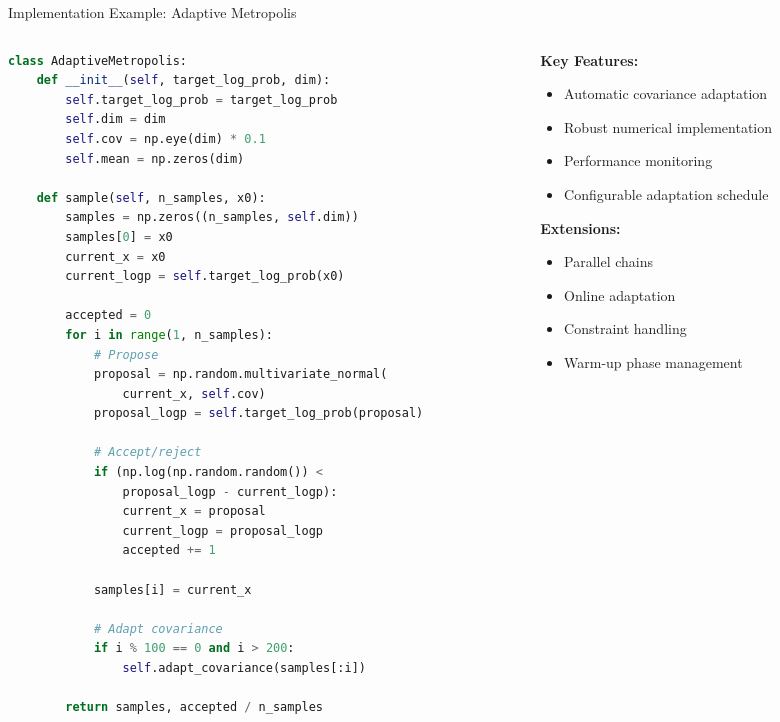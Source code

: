 \documentclass[aspectratio=169,11pt]{beamer}
\begin{document}
\begin{frame}[fragile]{Implementation Example: Adaptive Metropolis}
\begin{columns}
\begin{column}{0.55\textwidth}
\begin{lstlisting}[language=Python, basicstyle=\tiny]
class AdaptiveMetropolis:
    def __init__(self, target_log_prob, dim):
        self.target_log_prob = target_log_prob
        self.dim = dim
        self.cov = np.eye(dim) * 0.1
        self.mean = np.zeros(dim)
        
    def sample(self, n_samples, x0):
        samples = np.zeros((n_samples, self.dim))
        samples[0] = x0
        current_x = x0
        current_logp = self.target_log_prob(x0)
        
        accepted = 0
        for i in range(1, n_samples):
            # Propose
            proposal = np.random.multivariate_normal(
                current_x, self.cov)
            proposal_logp = self.target_log_prob(proposal)
            
            # Accept/reject
            if (np.log(np.random.random()) < 
                proposal_logp - current_logp):
                current_x = proposal
                current_logp = proposal_logp
                accepted += 1
                
            samples[i] = current_x
            
            # Adapt covariance
            if i % 100 == 0 and i > 200:
                self.adapt_covariance(samples[:i])
                
        return samples, accepted / n_samples
\end{lstlisting}
\end{column}
\begin{column}{0.45\textwidth}
\textbf{Key Features:}
\begin{itemize}
\item Automatic covariance adaptation
\item Robust numerical implementation
\item Performance monitoring
\item Configurable adaptation schedule
\end{itemize}

\vspace{0.3cm}
\textbf{Extensions:}
\begin{itemize}
\item Parallel chains
\item Online adaptation
\item Constraint handling
\item Warm-up phase management
\end{itemize}


\end{column}
\end{columns}
\end{frame}
\end{document}
